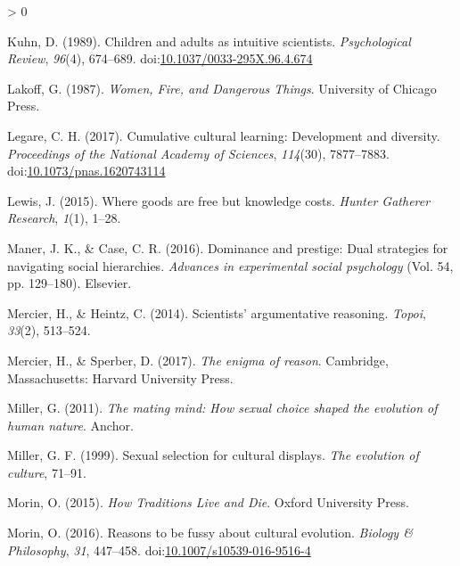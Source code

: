 \documentclass[
  11pt,
]{article}
\newlength{\cslhangindent}
\newenvironment{CSLReferences}[2] %
 {%
  \setlength{\parindent}{0pt}
  \ifodd #1 \everypar{\setlength{\hangindent}{\cslhangindent}}\ignorespaces\fi
  \ifnum #2 > 0
  \setlength{\parskip}{#2\baselineskip}
  \fi
 }%
 {}
\begin{document}
\begin{CSLReferences}{1}{0}
\leavevmode\hypertarget{ref-kuhnChildrenAdultsIntuitive1989}{}%
Kuhn, D. (1989). Children and adults as intuitive scientists. \emph{Psychological Review}, \emph{96}(4), 674--689. doi:\href{https://doi.org/10.1037/0033-295X.96.4.674}{10.1037/0033-295X.96.4.674}

\leavevmode\hypertarget{ref-lakoffWomenFireDangerous1987}{}%
Lakoff, G. (1987). \emph{Women, {Fire}, and {Dangerous Things}}. {University of Chicago Press}.

\leavevmode\hypertarget{ref-legareCumulativeCulturalLearning2017}{}%
Legare, C. H. (2017). Cumulative cultural learning: {Development} and diversity. \emph{Proceedings of the National Academy of Sciences}, \emph{114}(30), 7877--7883. doi:\href{https://doi.org/10.1073/pnas.1620743114}{10.1073/pnas.1620743114}

\leavevmode\hypertarget{ref-lewisWhereGoodsAre2015}{}%
Lewis, J. (2015). Where goods are free but knowledge costs. \emph{Hunter Gatherer Research}, \emph{1}(1), 1--28.

\leavevmode\hypertarget{ref-manerDominancePrestigeDual2016}{}%
Maner, J. K., \& Case, C. R. (2016). Dominance and prestige: {Dual} strategies for navigating social hierarchies. \emph{Advances in experimental social psychology} (Vol. 54, pp. 129--180). {Elsevier}.

\leavevmode\hypertarget{ref-mercierScientistsArgumentativeReasoning2014}{}%
Mercier, H., \& Heintz, C. (2014). Scientists' argumentative reasoning. \emph{Topoi}, \emph{33}(2), 513--524.

\leavevmode\hypertarget{ref-mercierEnigmaReason2017}{}%
Mercier, H., \& Sperber, D. (2017). \emph{The enigma of reason}. {Cambridge, Massachusetts}: {Harvard University Press}.

\leavevmode\hypertarget{ref-millerMatingMindHow2011}{}%
Miller, G. (2011). \emph{The mating mind: {How} sexual choice shaped the evolution of human nature}. {Anchor}.

\leavevmode\hypertarget{ref-millerSexualSelectionCultural1999}{}%
Miller, G. F. (1999). Sexual selection for cultural displays. \emph{The evolution of culture}, 71--91.

\leavevmode\hypertarget{ref-morinHowTraditionsLive2015}{}%
Morin, O. (2015). \emph{How {Traditions Live} and {Die}}. {Oxford University Press}.

\leavevmode\hypertarget{ref-morinReasonsBeFussy2016}{}%
Morin, O. (2016). Reasons to be fussy about cultural evolution. \emph{Biology \& Philosophy}, \emph{31}, 447--458. doi:\href{https://doi.org/10.1007/s10539-016-9516-4}{10.1007/s10539-016-9516-4}


\end{CSLReferences}
\end{document}
